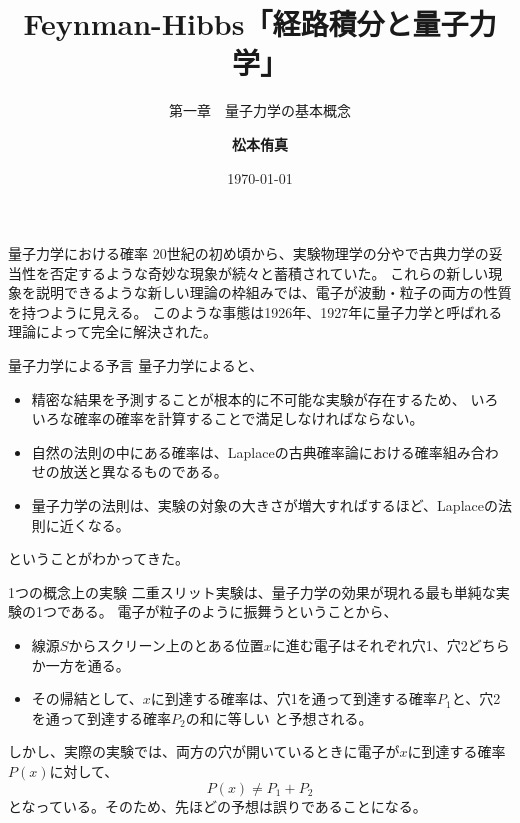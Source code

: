 \documentclass[11pt,aspectratio=169,xcolor=dvipsnames,table,dvipdfmx]{beamer}
\title{Feynman-Hibbs「経路積分と量子力学」}
\subtitle{第一章　量子力学の基本概念}
\author{\textbf{松本侑真}}
\date{\today}
\begin{document}
\maketitle

\begin{frame}{量子力学における確率}
  20世紀の初め頃から、実験物理学の分やで古典力学の妥当性を否定するような奇妙な現象が続々と蓄積されていた。
  これらの新しい現象を説明できるような新しい理論の枠組みでは、電子が波動・粒子の両方の性質を持つように見える。
  このような事態は1926年、1927年に{\color{red}量子力学}と呼ばれる理論によって完全に解決された。
  \begin{block}{量子力学による予言}
      量子力学によると、
    \begin{itemize}
      \item 精密な結果を予測することが根本的に不可能な実験が存在するため、
      いろいろな確率の確率を計算することで満足しなければならない。
      \item 自然の法則の中にある確率は、Laplaceの古典確率論における確率組み合わせの放送と異なるものである。
      \item 量子力学の法則は、実験の対象の大きさが増大すればするほど、Laplaceの法則に近くなる。
    \end{itemize}
      ということがわかってきた。
  \end{block}
\end{frame}

\begin{frame}{1つの概念上の実験}
  二重スリット実験は、量子力学の効果が現れる最も単純な実験の1つである。
  電子が粒子のように振舞うということから、
  \begin{itemize}
    \item 線源$S$からスクリーン上のとある位置$x$に進む電子はそれぞれ穴1、穴2どちらか一方を通る。
    \item その帰結として、$x$に到達する確率は、穴1を通って到達する確率$P_1$と、穴2を通って到達する確率$P_2$の和に等しい
    と予想される。
  \end{itemize}
  しかし、実際の実験では、両方の穴が開いているときに電子が$x$に到達する確率$P(x)$に対して、
  \begin{equation}
    P(x) \neq P_1 + P_2
  \end{equation}
  となっている。そのため、先ほどの予想は誤りであることになる。
\end{frame}
\end{document}

